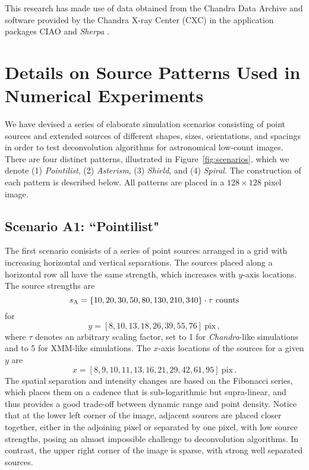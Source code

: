 \documentclass[twocolumn, linenumbers]{aastex631}
\begin{document}
    This research has made use of data obtained from the Chandra Data Archive and software provided by the Chandra X-ray Center (CXC) in the application packages CIAO \citep{Fruscione2006} and {\it Sherpa} \citep{Freeman2001,Burke2022}.
    
    \newpage
    

    \appendix
    \section{Details on Source Patterns Used in Numerical Experiments}
    
    \label{sec:app:A}

    We have devised a series of elaborate simulation scenarios  consisting of point sources and extended sources of different shapes, sizes, orientations, and spacings in order to test deconvolution algorithms for astronomical low-count images.  There are four distinct patterns, illustrated in Figure~\ref{fig:scenarios}, which we denote (1) {\sl Pointilist}, (2) {\sl Asterism}, (3) {\sl Shield}, and (4) {\sl Spiral}.  The construction of each pattern is described below.  All patterns are placed in a $128{\times}128$ pixel image.

    \subsection{Scenario A1: ``Pointilist"}
    The first scenario conisists of a series of point sources arranged in a grid with increasing horizontal and vertical separations.  The sources placed along a horizontal row all have the same strength, which increases with $y$-axis locations.  The source strengths are 
    $$s_{\rm A} = \{10, 20, 30, 50, 80, 130, 210, 340\} \cdot \tau ~\textrm{counts} $$
    for
    $$y = [8, 10, 13, 18, 26, 39, 55, 76]~\textrm{pix} \,,$$
    where $\tau$ denotes an arbitrary scaling factor, set to 1 for \textit{Chandra}-like simulations and to 5 for XMM-like simulations.
    The $x$-axis locations of the sources for a given $y$ are
    $$x=[8, 9, 10, 11, 13, 16, 21, 29, 42, 61, 95]~\textrm{pix} \,.$$
    The spatial separation and intensity changes are based on the Fibonacci series, which places them on a cadence that is sub-logarithmic but supra-linear, and thus provides a good trade-off between dynamic range and point density. Notice that at the lower left corner of the image, adjacent sources are placed closer together, either in the adjoining pixel or separated by one pixel, with low source strengths, posing an almost impossible challenge to deconvolution algorithms.  In contrast, the upper right corner of the image is sparse, with strong well separated sources.
\end{document}
